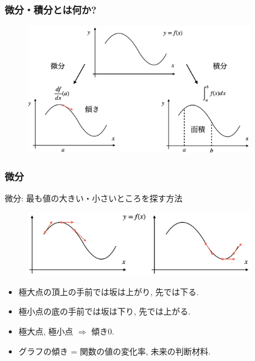 \documentclass[dvipdfmx,cjk,10.2pt]{beamer}
\theoremstyle{definition}
\begin{document}
\begin{frame}
\frametitle{微分・積分とは何か?}


 \begin{figure}[htbp]
 \begin{center} 
  \includegraphics[width=100mm]{diff_int.png}
 \end{center}
\end{figure}

\end{frame}




\begin{frame}
\frametitle{微分}

微分: 最も値の大きい・小さいところを探す方法

 \begin{figure}[htbp]
 \begin{center} 
  \includegraphics[width=100mm]{diff.png}
 \end{center}
\end{figure}


\begin{itemize}
\item 極大点の頂上の手前では坂は上がり, 先では下る. 
\item 極小点の底の手前では坂は下り, 先では上がる. 
\item 極大点, 極小点 $\Rightarrow$ 傾き0. 
\item グラフの傾き = 関数の値の変化率, 未来の判断材料. 
\end{itemize}

\end{frame}
\end{document}
